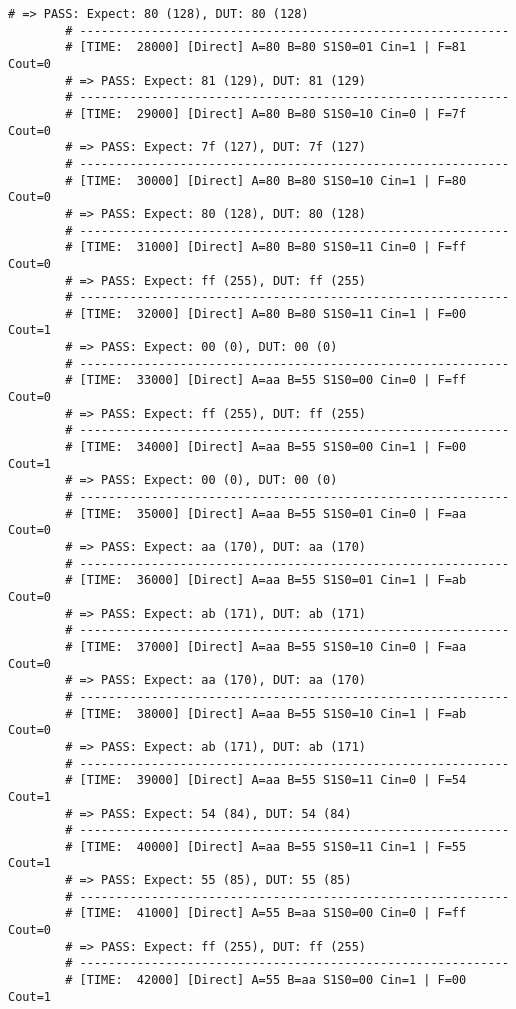 \begin{itemize}[label=-]
\begin{lstlisting}[style=StyleResult, language=Result, caption={Kết quả mô phỏng Directed Test.}]
		# => PASS: Expect: 80 (128), DUT: 80 (128)
		# ------------------------------------------------------------
		# [TIME:  28000] [Direct] A=80 B=80 S1S0=01 Cin=1 | F=81 Cout=0
		# => PASS: Expect: 81 (129), DUT: 81 (129)
		# ------------------------------------------------------------
		# [TIME:  29000] [Direct] A=80 B=80 S1S0=10 Cin=0 | F=7f Cout=0
		# => PASS: Expect: 7f (127), DUT: 7f (127)
		# ------------------------------------------------------------
		# [TIME:  30000] [Direct] A=80 B=80 S1S0=10 Cin=1 | F=80 Cout=0
		# => PASS: Expect: 80 (128), DUT: 80 (128)
		# ------------------------------------------------------------
		# [TIME:  31000] [Direct] A=80 B=80 S1S0=11 Cin=0 | F=ff Cout=0
		# => PASS: Expect: ff (255), DUT: ff (255)
		# ------------------------------------------------------------
		# [TIME:  32000] [Direct] A=80 B=80 S1S0=11 Cin=1 | F=00 Cout=1
		# => PASS: Expect: 00 (0), DUT: 00 (0)
		# ------------------------------------------------------------
		# [TIME:  33000] [Direct] A=aa B=55 S1S0=00 Cin=0 | F=ff Cout=0
		# => PASS: Expect: ff (255), DUT: ff (255)
		# ------------------------------------------------------------
		# [TIME:  34000] [Direct] A=aa B=55 S1S0=00 Cin=1 | F=00 Cout=1
		# => PASS: Expect: 00 (0), DUT: 00 (0)
		# ------------------------------------------------------------
		# [TIME:  35000] [Direct] A=aa B=55 S1S0=01 Cin=0 | F=aa Cout=0
		# => PASS: Expect: aa (170), DUT: aa (170)
		# ------------------------------------------------------------
		# [TIME:  36000] [Direct] A=aa B=55 S1S0=01 Cin=1 | F=ab Cout=0
		# => PASS: Expect: ab (171), DUT: ab (171)
		# ------------------------------------------------------------
		# [TIME:  37000] [Direct] A=aa B=55 S1S0=10 Cin=0 | F=aa Cout=0
		# => PASS: Expect: aa (170), DUT: aa (170)
		# ------------------------------------------------------------
		# [TIME:  38000] [Direct] A=aa B=55 S1S0=10 Cin=1 | F=ab Cout=0
		# => PASS: Expect: ab (171), DUT: ab (171)
		# ------------------------------------------------------------
		# [TIME:  39000] [Direct] A=aa B=55 S1S0=11 Cin=0 | F=54 Cout=1
		# => PASS: Expect: 54 (84), DUT: 54 (84)
		# ------------------------------------------------------------
		# [TIME:  40000] [Direct] A=aa B=55 S1S0=11 Cin=1 | F=55 Cout=1
		# => PASS: Expect: 55 (85), DUT: 55 (85)
		# ------------------------------------------------------------
		# [TIME:  41000] [Direct] A=55 B=aa S1S0=00 Cin=0 | F=ff Cout=0
		# => PASS: Expect: ff (255), DUT: ff (255)
		# ------------------------------------------------------------
		# [TIME:  42000] [Direct] A=55 B=aa S1S0=00 Cin=1 | F=00 Cout=1

\end{lstlisting}
\end{itemize}
